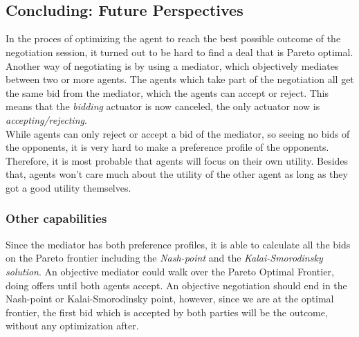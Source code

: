  \\ 

 \\

\subsection{Concluding: Future Perspectives}
In the proces of optimizing the agent to reach the best possible outcome of the negotiation session, it turned out to be hard to find a deal that is Pareto optimal. Another way of negotiating is by using a mediator, which objectively mediates between two or more agents. The agents which take part of the negotiation all get the same bid from the mediator, which the agents can accept or reject. This means that the \textit{bidding} actuator is now canceled, the only actuator now is \textit{accepting/rejecting}.\\

While agents can only reject or accept a bid of the mediator, so seeing no bids of the opponents, it is very hard to make a preference profile of the opponents. Therefore, it is most probable that agents will focus on their own utility. Besides that, agents won't care much about the utility of the other agent as long as they got a good utility themselves.  \\
\subsubsection{Other capabilities}
Since the mediator has both preference profiles, it is able to calculate all the bids on the Pareto frontier including the \textit{Nash-point} and the \textit{Kalai-Smorodinsky solution}. An objective mediator could walk over the Pareto Optimal Frontier, doing offers until both agents accept. An objective negotiation should end in the Nash-point or Kalai-Smorodinsky point, however, since we are at the optimal frontier, the first bid which is accepted by both parties will be the outcome, without any optimization after. 

